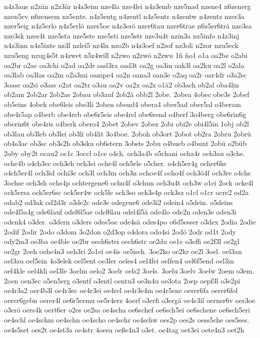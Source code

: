 {n4z3aus
n2zän
n2z3är
n4z3eim
nze4la
nze4lei
n4z3emb
nze5nad
nzene4
n6zenerg
nzen5ev
n6zensem
nz5ente.
n4z5entg
n4zentl
n4z5ents
n4zentw
n4zentz
nzer3a
nzer5eig
n4z5erlo
n4z5erlö
nzer5oe
n4z3erö
nzer6tau
nzer6trae
n6z5er6trä
nze3sa
nze3sk
nzes4t
nze5sta
nze5ste
nze5sti
nze5str
nze3u4t
nzin3a
nz5info
n4z3inj
n4z3inn
n4z5inte
nz3l
nzlei5
nz4ln
nzo2b
n4z3oef
n2zof
nz3oli
n2zor
nzu5eck
nzu5eng
nzug4s5t
n4zwet
n5z4will
n2zwo
n2zwö
n2zwu
1ñ
ño1
o1a
oa2be
o2abi
oa2br
o2ac
oa3chi
o2ad
oa2dr
oad3ra
oad3t
oa2g
oa3in
oak3l
oa2ku
oa2l
o2ala
oa3lab
oa3las
oa2m
o2a3mi
oampe4
oa2n
oana3
oan3e
o2aq
oa2r
oar4dr
o3a2sc
3oase
oa2si
o3ass
o2at
oa2tr
o3au
oa2v
oa2x
oa2z
o1ä2
ob3ach
ob2al
oba4lin
ob2am
2ob2ar
2ob2as
2obau
ob3auf
2ob2ä
obb2l
2obe.
2obea
4obec
obe3e
2obef
ob5eins
4obek
obe6leis
obe3li
2oben
obend4
obera4
ober5ad
ober5al
o4beram
obe4r5ap
o4berb
obe4reb
obe6r5eis
obe4rel
obe6rend
o4berf
3o4berg
obe6rin6g
oberin6t
obe4ris
o4berk
obero4
2obet
2obev
2obez
2obi
obi2e
obi4l5in
1obj
ob2l
ob3lau
ob3leb
ob3lei
ob3li
ob4lit
3o4boe.
2oboh
ob3ort
2obot
ob2ra
2obru
2obrü
ob4s3ac
ob3sc
ob3s2h
ob3sku
ob6stern
3obsts
2obu
o4bueb
o4bunt
2obü
o2büb
2oby
oby2t
ocau2
oc1c
3occl
o1ce
o4ch.
och3a4b
o5chani
ocha4r
och3au
o3che.
oche4b
o4ch3ec
och3eh
och3ei
oche4l
och5ele
o5cher.
o4ch5er4g
ocher6ke
o4ch5er4l
och3id
ochi3e
och3l
och3m
och3n
ochoe4f
ocho4f
och3ö4f
och3re
o4chs
3ochse
och3sh
ochs4p
ochtergene6
ochu4f
o3chun
och3u4t
och3w
o1ci
2ock
ocke4l
ock5ersa
ock5er6sc
ock5er4w
ock5le
ock3so
ock3s4p
ock3sz
o1cl
o1cr
ocre2
od2a
odab2
od3ak
od2d3r
o3de2c
ode3e
odegene6
ode3i2
odein4
o5dein.
o5deins
ode4l5a4g
ode6lauf
odel6l5ae
odel6lau
odel4l5ä
ode4lo
ode2n
oden3e
oden3i
odenk4
o3der.
o3dern
o3ders
odes5ae
ode4sä
odes4po
o6d5esser
o3dex
2odia
2odie
2odif
2odir
2odo
o3dom
3o2don
o2d3op
o4dora
odo4si
2odö
2odr
od1t
2ody
ody2m3
oe3ba
oe4ble
oe2br
oech6stei
oech6str
oe2du
oe1e
o3effi
oe2f3l
oe2gl
oe2gr
2oeh
oehe4n3
oeh3ri
2o1ei
oe4is
oe5isch.
3oe2ko
oe2kr
oe2l
3oel.
oel3an
oel3au
oel5ein
4o3elek
oel5ent
oe3ler
oeles4
oel4fei
oelfen4
oel6f5end
oel3in
oel4kle
oel4kli
oel3le
3oelm
oelo2
3oelr
oels2
3oels.
3oelu
3oelv
3oelw
2oem
o3em.
2oen
oen3ec
o5en5erg
o3entf
o3entl
oentu3
oe3n4u
oe3ota
2oep
oepf3l
o3e2pi
oe4r3a2
oer4b3l
oe4r3ec
oe4r3ei
oe4rel
oe4r3e4m
oe4r5ene
oerer6fa
oerer6fol
oerer6gebn
oerer4l
oe6r5ermu
oe5r4erz
4oerf
o3erfi
o3ergä
oe4r3il
oerner6v
oer3oe
o3erö
oers4k
oert6er
o2es
oe2sa
oe4scha
oe6schef
oe6sch5ei
oe6schene
oe6sch5eri
oe4schl
oe4schm
oe4schn
oe4scho
oe4schr
oe4schw
oes2p
oes2s
oess5che
oes5ses.
oe4s5set
oes2t
oe4st3a
oe4str
4oesu
oeße4n3
o3et.
oe4tag
oet3ei
oete4n3
oet2h
}
